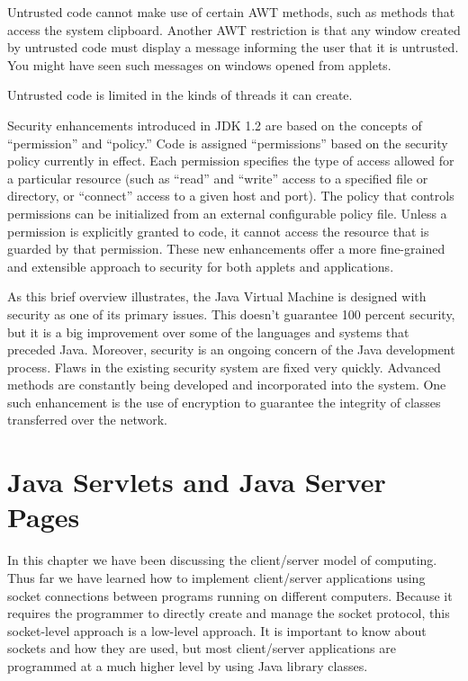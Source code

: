 {\begin{BL}
\item  Untrusted code cannot make use of certain AWT
methods, such as methods that access the system clipboard.   Another
AWT restriction is that any window created by untrusted code must
display a message informing the user that it is untrusted.  You might
have seen such messages on windows opened from applets.

\item  Untrusted code is limited in the kinds of threads
it can create.
\end{BL}

Security enhancements introduced in JDK 1.2 are based on the
concepts of ``permission'' and ``policy.'' Code is assigned
``permissions'' based on the security policy currently in effect.  Each
permission specifies the type of access allowed for a particular
resource (such as ``read'' and ``write'' access to a specified file or
directory, or ``connect'' access to a given host and port). The
policy that controls permissions can be initialized from an external
configurable policy file.  Unless a permission is explicitly granted to
code, it cannot access the resource that is guarded by that
permission.   These new enhancements offer a more fine-grained and
extensible approach to security for both applets and applications.

As this brief overview illustrates, the Java Virtual Machine is
designed with security as one of its primary issues.  This
doesn't guarantee 100 percent
security, but it is a big improvement over some of
the languages and systems that preceded Java.   Moreover, security is
an ongoing concern of the Java development process.   Flaws in the existing
security system are fixed very quickly.   Advanced methods are
constantly being developed and incorporated into the system.  One such
enhancement is the use of encryption to guarantee the integrity of
classes transferred over the network.

\section{Java Servlets and Java Server Pages}
\label{java-servletsand-java-server-pages}

In this chapter we have been discussing the client/server model of
computing.  Thus far we have learned how to implement client/server
applications using socket connections between programs running on
different computers. Because it requires the programmer to directly
create and manage the socket protocol, this socket-level approach is a
low-level approach.  It is important to know about sockets and how
they are used, but most client/server applications are programmed at a
much higher level by using Java library classes.

}
